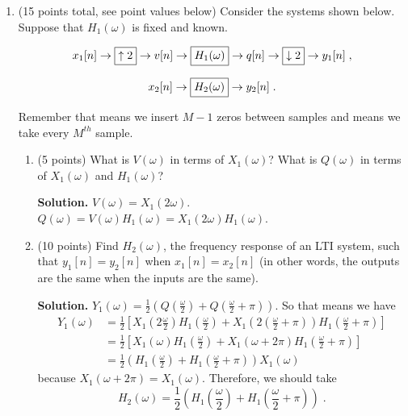 \documentclass[]{siamltex}
\begin{document}
\begin{enumerate}
\newpage
\item (15 points total, see point values below) Consider the systems shown below. Suppose that $H_1(\omega)$ is fixed and known. 

$$x_1[n] \rightarrow \fbox{$\uparrow 2$} \rightarrow v[n]  \rightarrow \fbox{$H_1(\omega)$}  \rightarrow q[n]\rightarrow \fbox{$\downarrow 2$} \rightarrow y_1[n]\;,$$

$$x_2[n] \rightarrow \fbox{$H_2(\omega)$} \rightarrow y_2[n]\;.$$

\vspace{3mm} Remember that  means we insert $M-1$ zeros between samples and  means we take every $M^{th}$ sample.

\vspace{3mm} 
\begin{enumerate}
\item (5 points) What is $V(\omega)$ in terms of $X_1(\omega)$? What is $Q(\omega)$ in terms of $X_1(\omega)$ and $H_1(\omega)$?

\vspace{1cm} 
\textbf{Solution.} $V(\omega) = X_1(2\omega)$. $Q(\omega) = V(\omega) H_1(\omega) = X_1(2\omega) H_1(\omega)$.


\vspace{2cm} \item (10 points) Find $H_2(\omega)$, the frequency response of an LTI system, such that $y_1[n] = y_2[n]$ when $x_1[n] = x_2[n]$ (in other words, the outputs are the same when the inputs are the same).

\vspace{1cm} 
\textbf{Solution.} $Y_1(\omega) = \frac{1}{2} \left( Q\left(\frac{\omega}{2}\right) + Q\left(\frac{\omega}{2} + \pi\right) \right)$. So that means we have 
\begin{align*}
Y_1(\omega) &= \frac{1}{2} \left[ X_1\left(2\frac{\omega}{2}\right)  H_1\left(\frac{\omega}{2}\right)   +  X_1\left(2\left(\frac{\omega}{2}+\pi\right)\right)  H_1\left(\frac{\omega}{2} + \pi\right)  \right] \\
&= \frac{1}{2} \left[ X_1(\omega)  H_1\left(\frac{\omega}{2}\right)   +  X_1(\omega + 2\pi)  H_1\left(\frac{\omega}{2} + \pi\right)  \right] \\
&= \frac{1}{2} \left(  H_1\left(\frac{\omega}{2}\right)   +  H_1\left(\frac{\omega}{2} + \pi\right)  \right) X_1(\omega) 
\end{align*} because $X_1(\omega + 2\pi)  = X_1(\omega)$. Therefore, we should take $$H_2(\omega) = \frac{1}{2} \left(  H_1\left(\frac{\omega}{2}\right)   +  H_1\left(\frac{\omega}{2} + \pi\right) \right)\;.$$



\end{enumerate}
\end{enumerate}
\end{document}
